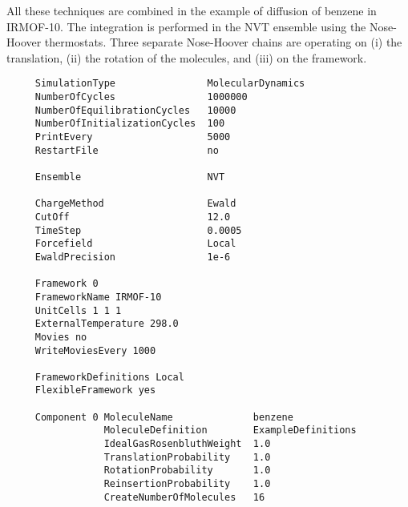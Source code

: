All these techniques are combined in the example of diffusion of benzene in IRMOF-10. The integration is performed in the NVT ensemble using the Nose-Hoover thermostats.
Three separate Nose-Hoover chains are operating on (i) the translation, (ii) the rotation of the molecules, and (iii) on the framework.

\begin{tiny}
\begin{verbatim}
     SimulationType                MolecularDynamics
     NumberOfCycles                1000000
     NumberOfEquilibrationCycles   10000
     NumberOfInitializationCycles  100
     PrintEvery                    5000
     RestartFile                   no

     Ensemble                      NVT

     ChargeMethod                  Ewald
     CutOff                        12.0
     TimeStep                      0.0005
     Forcefield                    Local
     EwaldPrecision                1e-6

     Framework 0
     FrameworkName IRMOF-10
     UnitCells 1 1 1
     ExternalTemperature 298.0
     Movies no
     WriteMoviesEvery 1000

     FrameworkDefinitions Local
     FlexibleFramework yes

     Component 0 MoleculeName              benzene
                 MoleculeDefinition        ExampleDefinitions
                 IdealGasRosenbluthWeight  1.0
                 TranslationProbability    1.0
                 RotationProbability       1.0
                 ReinsertionProbability    1.0
                 CreateNumberOfMolecules   16
\end{verbatim}
\end{tiny}

